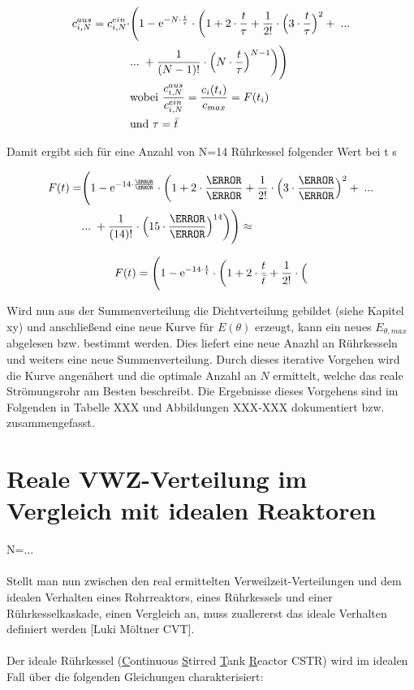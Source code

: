 \documentclass[12pt,liststotoc]{report}
\begin{document}
\begin{align}
c_{i,N}^{aus}=c_{i,N}^{ein} \cdot &\Biggl(1-\text{e}^{-N\cdot\frac{t}{\tau}} \cdot \biggl(1+2\cdot\frac{t}{\tau} + \frac{1}{2!}\cdot \Bigl(3\cdot\frac{t}{\tau}\Bigr)^2 +\;...\\
&...\;+\frac{1}{(N-1)!}\cdot\Bigl(N\cdot\frac{t}{\tau}\Bigr)^{N-1} \biggr)\Biggr) \nonumber\\\notag 
&\text{wobei } \frac{c_{i,N}^{aus}}{c_{i,N}^{ein}}= \frac{c_i(t_i)}{c_{max}}=F(t_i)\\\notag
&\text{und } \tau = \bar{t}\notag
\end{align}

Damit ergibt sich für eine Anzahl von N=14 Rührkessel folgender Wert bei t s

\begin{align}
F(t)=&\Biggl(1-\text{e}^{-14\cdot\frac{\s}{\s}} \cdot \biggl(1+2\cdot\frac{\s}{\s} + \frac{1}{2!}\cdot \Bigl(3\cdot\frac{\s}{\s}\Bigr)^2 +\;...\\
&...\;+\frac{1}{(14)!}\cdot\Bigl(15\cdot\frac{\s}{\s}\Bigr)^{14} \biggr)\Biggr)\approx \nonumber
\end{align}

\begin{align}
F(t) = \Biggl(1-\text{e}^{-14 \cdot \frac{t}{\bar{t}}} \cdot \biggl(1+2\cdot \frac{t}{\bar{t}} + \frac{1}{2!} \cdot \Bigl(
\end{align}

Wird nun aus der Summenverteilung die Dichtverteilung gebildet (siehe Kapitel xy) und anschließend eine neue Kurve für $E(\theta)$ erzeugt, kann ein neues $E_{\theta,max}$ abgelesen bzw. bestimmt werden. Dies liefert eine neue Anazhl an Rührkesseln und weiters eine neue Summenverteilung. Durch dieses iterative Vorgehen wird die Kurve angenähert und die optimale Anzahl an $N$ ermittelt, welche das reale Strömungsrohr am Besten beschreibt. Die Ergebnisse dieses Vorgehens sind im Folgenden in Tabelle XXX und Abbildungen XXX-XXX dokumentiert bzw. zusammengefasst.







\section{Reale VWZ-Verteilung im Vergleich mit idealen Reaktoren}

N=...
\\
\\
Stellt man nun zwischen den real ermittelten Verweilzeit-Verteilungen und dem idealen Verhalten eines Rohrreaktors, eines Rührkessels und einer Rührkesselkaskade, einen Vergleich an, muss zuallererst das ideale Verhalten definiert werden [Luki Möltner CVT].  
\\
\\
Der ideale Rührkessel (\underline{C}ontinuous \underline{S}tirred \underline{T}ank \underline{R}eactor CSTR) wird im idealen Fall über die folgenden Gleichungen charakterisiert:
\end{document}
